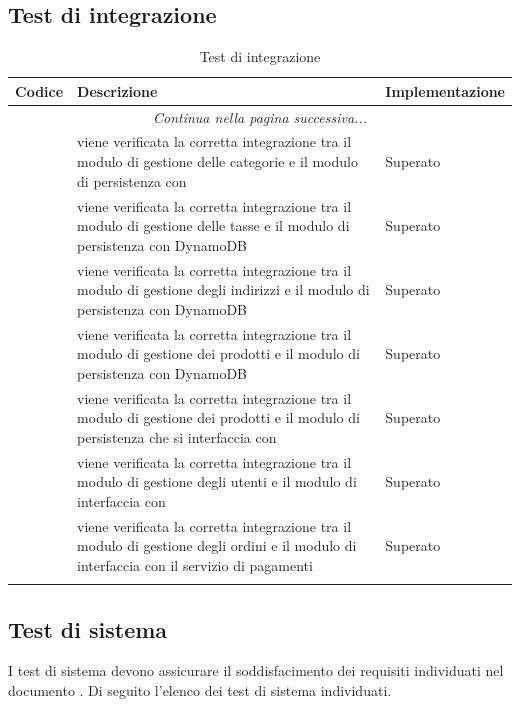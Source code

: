 \subsection{Test di integrazione}\label{_testIntegrazione}

\begin{center}
	\begin{longtable}{|p{1cm}|p{11cm}|p{3cm}|}
		\hline
		\rowcolor{lighter-grayer}
		\textbf{Codice} & \textbf{Descrizione} & \textbf{Implementazione} \\
		\hline
		\endfirsthead
		\hline
		\multicolumn{3}{|c|}{\textit{Continua nella pagina successiva...}} \\
		\hline
		\endfoot
		\endlastfoot
		\hline

		 & viene verificata la corretta integrazione tra il modulo di gestione delle categorie e il modulo di persistenza con \glock{DynamoDB} & Superato \\
		 & viene verificata la corretta integrazione tra il modulo di gestione delle tasse e il modulo di persistenza con DynamoDB & Superato \\
		 & viene verificata la corretta integrazione tra il modulo di gestione degli indirizzi e il modulo di persistenza con DynamoDB & Superato \\
		 & viene verificata la corretta integrazione tra il modulo di gestione dei prodotti e il modulo di persistenza con DynamoDB & Superato \\
		 & viene verificata la corretta integrazione tra il modulo di gestione dei prodotti e il modulo di persistenza che si interfaccia con \glock{S3} & Superato \\
		 & viene verificata la corretta integrazione tra il modulo di gestione degli utenti e il modulo di interfaccia con \glock{AWS Cognito} & Superato \\
		 & viene verificata la corretta integrazione tra il modulo di gestione degli ordini e il modulo di interfaccia con il servizio di pagamenti \glock{Stripe} & Superato \\
	
		


		\hline
		\rowcolor{white}
		\caption{Test di integrazione}
	\end{longtable}
\end{center}

\subsection{Test di sistema} \label{_testSistema}
I test di sistema devono assicurare il soddisfacimento dei requisiti individuati nel documento .
Di seguito l'elenco dei test di sistema individuati.

